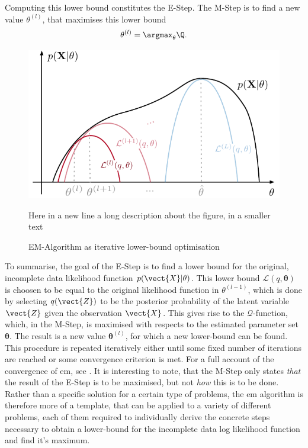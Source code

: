 Computing this lower bound constitutes the E-Step. The M-Step is to find a new value $\theta^{(l)}$, that maximises this lower bound
\begin{equation}
\label{eq:m-step}
    \theta^{(l)} = \argmax_{\theta}\Q.
\end{equation}

\begin{figure}[!hb]
\label{fig:em}
    \centering
    \includegraphics[scale=1]{data/figures/em-Q4}
    \caption[Short Title for EM-Algorithm]{EM-Algorithm as iterative lower-bound optimisation}
    \medskip
    \small
    Here in a new line a long description about the figure, in a smaller text
\end{figure}

To summarise, the goal of the E-Step is to find a lower bound for the original, incomplete data likelihood function $p(\vect{X}\vert\theta)$. This lower bound $\mathcal{L}(q,\bm\theta)$ is choosen to be equal to the original likelihood function in $\theta^{(l-1)}$, which is done by selecting $q(\vect{Z})$ to be the posterior probability of the latent variable $\vect{Z}$ given the observation $\vect{X}$. This gives rise to the $\mathcal{Q}$-function, which, in the M-Step, is maximised with respects to the estimated parameter set $\bm\theta$. The result is a new value $\bm\theta^{(l)}$, for which a new lower-bound can be found. This procedure is repeated iteratively either until some fixed number of iterations are reached or some convergence criterion is met. For a full account of the convergence of \gls{em}, see \cite{Wu1983}. It is interesting to note, that the M-Step only states \textit{that} the result of the E-Step is to be maximised, but not \textit{how} this is to be done. Rather than a specific solution for a certain type of problems, the \gls{em} algorithm is therefore more of a template, that can be applied to a variety of different problems, each of them required to individually derive the concrete steps necessary to obtain a lower-bound for the incomplete data log likelihood function and find it's maximum.

